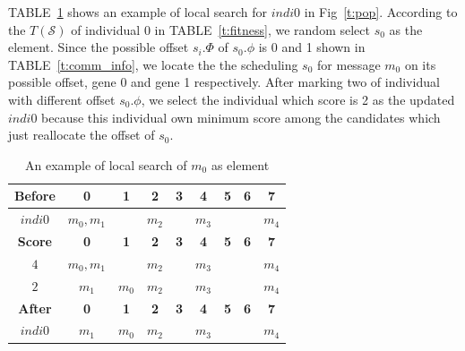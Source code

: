 \documentclass[journal]{IEEEtran}
\newcommand{\calS}{\mathcal{S}}
\theoremstyle{remark}
\begin{document}
TABLE~\ref{t:local} shows an example of local search for $indi0$ in Fig~\ref{t:pop}.
According to the $T(\calS)$ of individual 0 in TABLE~\ref{t:fitness},
 we random select $s_0$ as the element. 
Since the possible offset $s_i.\Phi$ of $s_0.\phi$ is 0 and 1 shown in TABLE~\ref{t:comm_info},
  we locate the the scheduling $s_0$ for message $m_0$ on its possible offset, gene 0 and gene 1 respectively.
After marking two of individual with different offset $s_0.\phi$,
 we select the individual which score is 2 as the updated $indi0$ because this individual own minimum score among the candidates which just reallocate the offset of $s_0$.
\begin{table}[!t]
	\renewcommand{\arraystretch}{1.3}
	\newcommand{\tabincell}[2]{\begin{tabular}{@{}#1@{}}#2\end{tabular}}
	\caption{An example of local search of $m_0$ as element}
	\label{t:local}
	\centering
	\begin{tabular}{|c||c||c||c||c||c||c||c||c|}
		\hline
		\textbf{Before}& 
		\textbf{0} & 
		\textbf{1} & 
		\textbf{2} & 
		\textbf{3} &
		\textbf{4} & 
		\textbf{5} & 
		\textbf{6} & 
		\textbf{7} \\		
		\hline
		$indi0$	&$m_0,m_1$&	&$m_2$&	&$m_3$& & &$m_4$\\		
		\hline
		\hline
		\textbf{Score}& 
		\textbf{0} & 
		\textbf{1} & 
		\textbf{2} & 
		\textbf{3} &
		\textbf{4} & 
		\textbf{5} & 
		\textbf{6} & 
		\textbf{7} \\		
		\hline
		$4$	&$m_0,m_1$&	&$m_2$&	&$m_3$& & &$m_4$\\
		\hline
		$2$	&$m_1$&$m_0$&$m_2$&	&$m_3$& & &$m_4$\\		
		\hline
		\hline		
		\textbf{After}& 
		\textbf{0} & 
		\textbf{1} & 
		\textbf{2} & 
		\textbf{3} &
		\textbf{4} & 
		\textbf{5} & 
		\textbf{6} & 
		\textbf{7} \\		
		\hline
		$indi0$&$m_1$&$m_0$&$m_2$&	&$m_3$& & &$m_4$\\		
		\hline
	\end{tabular}
\end{table}
\end{document}
